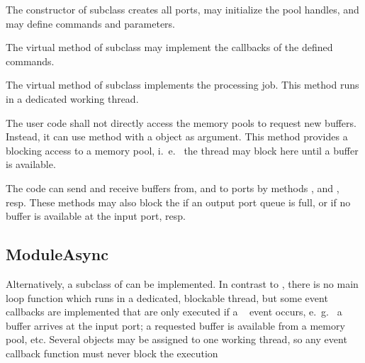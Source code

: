 \begin{compactenum}
\item  The constructor of  subclass  creates all 
      ports, may initialize the pool handles, and may 
      define commands and parameters. 
\item  The virtual  method of  
      subclass may implement the callbacks of the defined commands.
\item  The virtual  method of  
      subclass implements the processing job. This method runs in a dedicated working thread.  
\item  The user code shall not directly access the 
      memory pools to request new buffers. Instead, it can use  method 
       with a  object as argument.
      This method provides a blocking access to a memory pool, i.~e.~ the  thread may block here until a buffer is available.
      
\item  The  code can send and receive buffers   
      from, and to ports by  methods , and
    , resp. These methods may also block the  if an output port queue is full, or if no buffer is available at the input port, resp.

\end{compactenum}

\subsection{ModuleAsync}

Alternatively, a subclass of  
can be implemented. In contrast to ,
there is no main loop function which runs in a dedicated, blockable thread,
but some event callbacks are implemented that are only executed if a 
\dabc~ event occurs, e.~g.~ a buffer arrives at the input port; a requested
buffer is available from a memory pool, etc.
Several  objects may be assigned to one working thread,
so any event callback function must never block the execution

